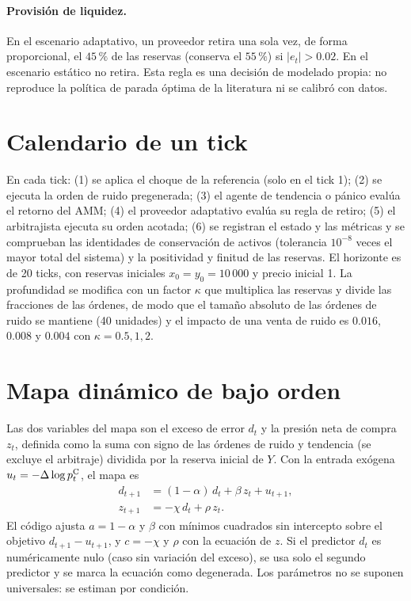 \paragraph{Provisión de liquidez.} En el escenario adaptativo, un proveedor retira una sola vez, de forma proporcional, el $45\,\%$ de las reservas (conserva el $55\,\%$) si $|e_t|>0.02$. En el escenario estático no retira. Esta regla es una decisión de modelado propia: no reproduce la política de parada óptima de la literatura \cite{bergault2025exit} ni se calibró con datos.

\section{Calendario de un tick}

En cada tick: (1) se aplica el choque de la referencia (solo en el tick 1); (2) se ejecuta la orden de ruido pregenerada; (3) el agente de tendencia o pánico evalúa el retorno del AMM; (4) el proveedor adaptativo evalúa su regla de retiro; (5) el arbitrajista ejecuta su orden acotada; (6) se registran el estado y las métricas y se comprueban las identidades de conservación de activos (tolerancia $10^{-8}$ veces el mayor total del sistema) y la positividad y finitud de las reservas. El horizonte es de 20 ticks, con reservas iniciales $x_0=y_0=10\,000$ y precio inicial 1. La profundidad se modifica con un factor $\kappa$ que multiplica las reservas y divide las fracciones de las órdenes, de modo que el tamaño absoluto de las órdenes de ruido se mantiene (40 unidades) y el impacto de una venta de ruido es $0.016$, $0.008$ y $0.004$ con $\kappa=0.5,1,2$.

\section{Mapa dinámico de bajo orden}

Las dos variables del mapa son el exceso de error $d_t$ y la presión neta de compra $z_t$, definida como la suma con signo de las órdenes de ruido y tendencia (se excluye el arbitraje) dividida por la reserva inicial de $Y$. Con la entrada exógena $u_t=-\Delta\log p^{\mathrm{C}}_t$, el mapa es
\begin{align}
  d_{t+1} &= (1-\alpha)\,d_t + \beta\,z_t + u_{t+1}, \label{eq:mapa-d}\\
  z_{t+1} &= -\chi\,d_t + \rho\,z_t. \label{eq:mapa-z}
\end{align}
El código ajusta $a=1-\alpha$ y $\beta$ con mínimos cuadrados sin intercepto sobre el objetivo $d_{t+1}-u_{t+1}$, y $c=-\chi$ y $\rho$ con la ecuación de $z$. Si el predictor $d_t$ es numéricamente nulo (caso sin variación del exceso), se usa solo el segundo predictor y se marca la ecuación como degenerada. Los parámetros no se suponen universales: se estiman por condición.

